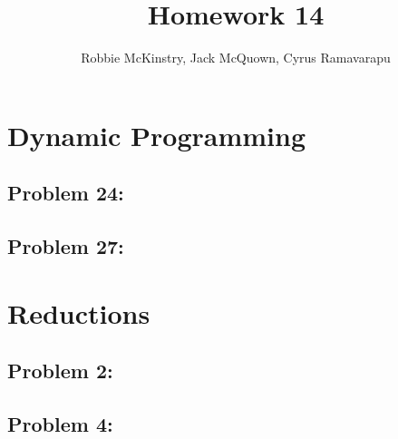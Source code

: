 \documentclass[12pt]{article}
\begin{document}
\title{Homework 14}
\author{Robbie McKinstry, Jack McQuown, Cyrus Ramavarapu}
\renewcommand{\today}{3 October 2016}
\renewcommand{\baselinestretch}{1.5}
\maketitle

\section*{Dynamic Programming}
\subsection*{Problem 24:}
\subsection*{Problem 27:}

\section*{Reductions}
\subsection*{Problem 2:}
\subsection*{Problem 4:}
\end{document}
